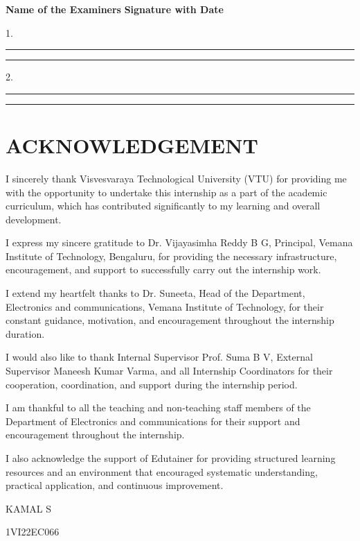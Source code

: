 \documentclass[12pt,a4paper]{report}
\begin{document}
\vspace{0.8cm}
\textbf{Name of the Examiners} \hfill \textbf{Signature with Date}\par
\vspace{0.3cm}
1.\enspace\rule{5cm}{0.4pt} \hfill \rule{3.5cm}{0.4pt}\par
\vspace{0.5cm}
2.\enspace\rule{5cm}{0.4pt} \hfill \rule{3.5cm}{0.4pt}\par



\newpage
\chapter*{ACKNOWLEDGEMENT}

I sincerely thank Visvesvaraya Technological University (VTU) for providing me with the opportunity to undertake this internship as a part of the academic curriculum, which has contributed significantly to my learning and overall development.

I express my sincere gratitude to Dr. Vijayasimha Reddy B G, Principal, Vemana Institute of Technology, Bengaluru, for providing the necessary infrastructure, encouragement, and support to successfully carry out the internship work.

I extend my heartfelt thanks to Dr. Suneeta, Head of the Department, Electronics and communications, Vemana Institute of Technology, for their constant guidance, motivation, and encouragement throughout the internship duration.

I would also like to thank Internal Supervisor Prof. Suma B V, External Supervisor Maneesh Kumar Varma, and all Internship Coordinators for their cooperation, coordination, and support during the internship period.

I am thankful to all the teaching and non-teaching staff members of the Department of Electronics and communications for their support and encouragement throughout the internship.

I also acknowledge the support of Edutainer for providing structured learning resources and an environment that encouraged systematic understanding, practical application, and continuous improvement.

\vspace{0.5cm}
KAMAL S\par
1VI22EC066\par
\end{document}
